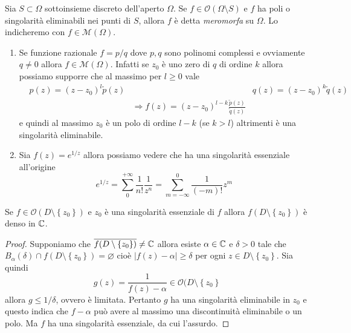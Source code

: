 \begin{definition}
  Sia $S \subset \Omega$ sottoinsieme discreto dell'aperto $\Omega$. Se $f \in
  \mathcal{O}(\Omega \setminus S)$ e $f$ ha poli o singolarità eliminabili nei
  punti di $S$, allora $f$ è detta \emph{meromorfa} su $\Omega$. Lo indicheremo
  con $f \in \mathcal{M}(\Omega)$.
  \label{def:meromorfismo}
\end{definition}

\begin{example}
  \begin{enumerate}
    \item Se funzione razionale $f= p / q$ dove $p,q$ sono polinomi complessi
      e ovviamente $q \neq 0$ allora $f \in \mathcal{M}(\Omega)$. Infatti se
      $z_0$ è uno zero di $q$ di ordine $k$ allora possiamo supporre che al
      massimo per $l \ge 0$ vale 
      \begin{align*}
        & p(z) = (z-z_0)^l \tilde{p}(z) &  & q(z)  = (z-z_0)^k \tilde{q}(z)  \\
        & & \Longrightarrow f(z)  = (z-z_0)^{l-k}
        \frac{\tilde{p}(z)}{\tilde{q}(z)} 
      \end{align*}
      e quindi al massimo $z_0$ è un polo di ordine $l-k$ (se $k > l$)
      altrimenti è una singolarità eliminabile. 
    \item Sia $f(z) = e^{1/z}$ allora possiamo vedere che ha una singolarità
      essenziale all'origine
      \begin{equation*}
        e^{1/z} = \sum_{0}^{+\infty} \frac{1}{n!}\frac{1}{z^n} = \sum_{m
        = -\infty}^{0} \frac{1}{(-m)!} z^m 
      \end{equation*}
  \end{enumerate}
\end{example}

\begin{theorem}
    Se $f \in \mathcal{O}(D \setminus \left\{z_0  \right\})$ e $z_0$ è una
    singolarità essenziale di $f$ allora $f(D \setminus \left\{ z_0 \right\})$
    è denso in $\mathbb{C}$.
  \label{thr:casorati_weierstrass}
\end{theorem}
\begin{proof}
  Supponiamo che $\overline{f(D \setminus \left\{ z_0 \right\})} \neq \mathbb{C}$ allora
  esiste $\alpha \in \mathbb{C}$ e $\delta > 0$ tale che $B_{\alpha}(\delta) \cap f(D
  \setminus \left\{ z_0 \right\}) = \varnothing$ cioè $|f(z) - \alpha| \ge
  \delta$ per ogni $z \in D \setminus \left\{ z_0 \right\}$. Sia quindi
  \begin{equation*}
    g(z) = \frac{1}{f(z) - \alpha} \in \mathcal{O}(D \setminus \left\{ z_0
      \right\}
  \end{equation*}
  allora $g \le 1/\delta$, ovvero è limitata. Pertanto $g$ ha una singolarità
  eliminabile in $z_0$ e questo indica che $f - \alpha$ può avere al massimo una
  discontinuità eliminabile o un polo. Ma $f$ ha una singolarità essenziale, da
  cui l'assurdo.
\end{proof}


